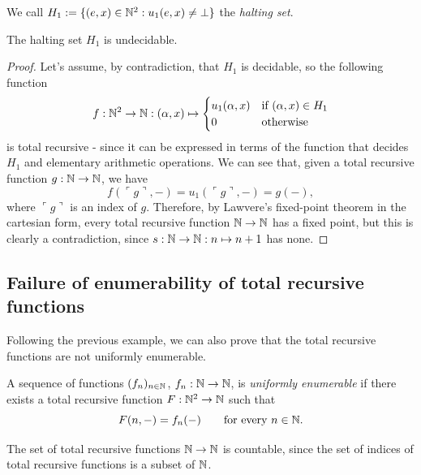 \begin{definition}[$H_1$]
    We call $H_1 := \{(e,x) \in \mathbb{N}^2 : u_1(e,x) \ne \bot\}$ the \emph{halting set}.
\end{definition}

\begin{theorem}
    The halting set $H_1$ is undecidable.
\end{theorem}

\begin{proof}
    Let's assume, by contradiction, that $H_1$ is decidable, so the following function
    \[ f : \mathbb{N}^2 \to \mathbb{N} : (\alpha,x) \mapsto \begin{cases}
        u_1(\alpha,x) &\text{if $(\alpha,x) \in H_1$} \\
        0 &\text{otherwise}
    \end{cases} \]
    is total recursive - since it can be expressed in terms of the function that decides $H_1$ and elementary arithmetic operations.
    We can see that, given a total recursive function $g : \mathbb{N} \to \mathbb{N}$, we have
    \[ f(\ulcorner g \urcorner,-) = u_1(\ulcorner g \urcorner,-) = g(-), \]
    where $\ulcorner g \urcorner$ is an index of $g$.
    Therefore, by Lawvere's fixed-point theorem in the cartesian form, every total recursive function $\mathbb{N} \to \mathbb{N}$ has a fixed point,
    but this is clearly a contradiction, since $s : \mathbb{N} \to \mathbb{N} : n \mapsto n + 1$ has none.
\end{proof}

\subsection*{Failure of enumerability of total recursive functions}
Following the previous example, we can also prove that the total recursive functions are not uniformly enumerable.

\begin{definition}
    A sequence of functions $(f_n)_{n \in \mathbb{N}}$, $f_n : \mathbb{N} \to \mathbb{N}$, is \emph{uniformly enumerable} if there exists a total recursive function $F : \mathbb{N}^2 \to \mathbb{N}$ such that
    \[ F(n,-) = f_n(-) \qquad \text{for every $n \in \mathbb{N}$}. \]
\end{definition}

\begin{remark}
    The set of total recursive functions $\mathbb{N} \to \mathbb{N}$ is countable, since the set of indices of total recursive functions is a subset of $\mathbb{N}$.
\end{remark}

